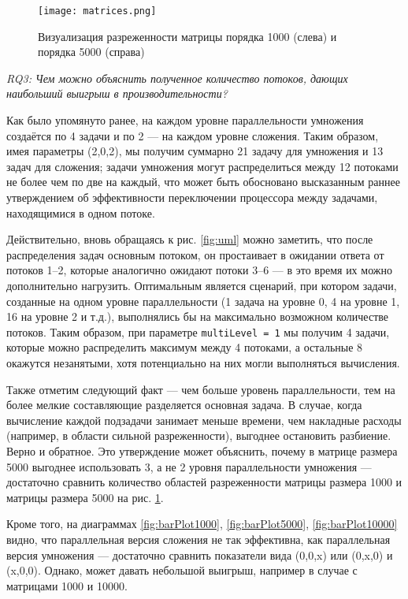 \begin{figure}
    \centering
    \texttt{[image: matrices.png]}
    \caption{Визуализация разреженности матрицы порядка 1000 (слева) и порядка 5000 (справа)}
    \label{fig:mtx}
\end{figure}

\textit{RQ3:  Чем можно объяснить полученное количество потоков, дающих наибольший выигрыш в производительности?}

Как было упомянуто ранее, на каждом уровне параллельности умножения создаётся по 4 задачи и по 2 --- на каждом уровне сложения. Таким образом,  имея параметры (2,0,2), мы получим суммарно 21 задачу для умножения и 13 задач для сложения; задачи умножения могут распределиться между 12 потоками не более чем по две на каждый, что может быть обосновано высказанным раннее утверждением об эффективности переключении процессора между задачами, находящимися в одном потоке.

Действительно, вновь обращаясь к рис. \ref{fig:uml} можно заметить, что после распределения задач основным потоком, он простаивает в ожидании ответа от потоков 1--2, которые аналогично ожидают потоки 3--6 --- в это время их можно дополнительно нагрузить. Оптимальным является сценарий, при котором задачи, созданные на одном уровне параллельности (1 задача на уровне 0, 4 на уровне 1, 16 на уровне 2 и т.д.), выполнялись бы на максимально возможном количестве потоков. Таким образом, при параметре \texttt{multiLevel = 1} мы получим 4 задачи, которые можно распределить максимум между 4 потоками, а остальные 8 окажутся незанятыми, хотя потенциально на них могли выполняться вычисления. 

Также отметим следующий факт --- чем больше уровень параллельности, тем на более мелкие составляющие разделяется основная задача. В случае, когда вычисление каждой подзадачи занимает меньше времени, чем накладные расходы (например, в области сильной разреженности), выгоднее остановить разбиение. Верно и обратное. Это утверждение может объяснить, почему в матрице размера 5000 выгоднее использовать 3, а не 2 уровня параллельности умножения ---достаточно сравнить количество областей разреженности матрицы размера 1000 и матрицы размера 5000 на рис. \ref{fig:mtx}.

Кроме того, на диаграммах \ref{fig:barPlot1000}, \ref{fig:barPlot5000}, \ref{fig:barPlot10000} видно, что параллельная версия сложения не так эффективна, как параллельная версия умножения --- достаточно сравнить показатели вида (0,0,x) или (0,x,0) и (x,0,0). Однако, может давать небольшой выигрыш, например в случае с матрицами 1000 и 10000.

